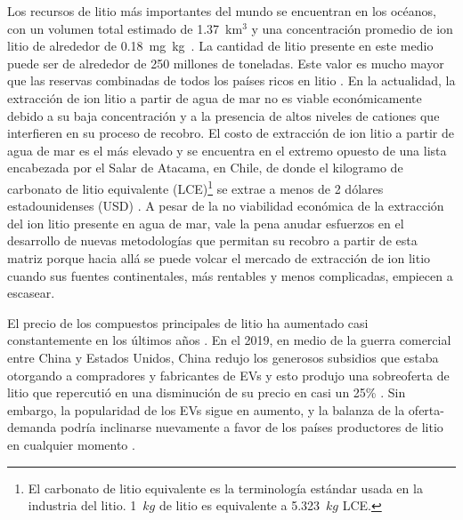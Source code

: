 Los recursos de litio más importantes del mundo se encuentran en los océanos, con un volumen total estimado de 1.37~km$^3$ y una concentración promedio de ion litio de alrededor de 0.18~mg~kg\mnn\ \citep{KRESS20191, Evans2013, HOSHINO201311}. La cantidad de litio presente en este medio puede ser de alrededor de 250 millones de toneladas. Este valor es mucho mayor que las reservas combinadas de todos los países ricos en litio \citep{Yang2018}. En la actualidad, la extracción de ion litio a partir de agua de mar no es viable económicamente debido a su baja concentración y a la presencia de altos niveles de cationes que interfieren en su proceso de recobro. El costo de extracción de ion litio a partir de agua de mar es el más elevado y se encuentra en el extremo opuesto de una lista encabezada por el Salar de Atacama, en Chile, de donde el kilogramo de carbonato de litio equivalente (LCE)\footnote{El carbonato de litio equivalente es la terminología estándar usada en la industria del litio. 1~$kg$ de litio es equivalente a 5.323~$kg$ LCE.} se extrae a menos de 2 dólares estadounidenses (USD) \citep{KUSHNIR2012}. A pesar de la no viabilidad económica de la extracción del ion litio presente en agua de mar, vale la pena anudar esfuerzos en el desarrollo de nuevas metodologías que permitan su recobro a partir de esta matriz porque hacia allá se puede volcar el mercado de extracción de ion litio cuando sus fuentes continentales, más rentables y menos complicadas, empiecen a escasear.

El precio de los compuestos principales de litio ha aumentado casi constantemente en los últimos años \citep{MARTIN2017}. En el 2019, en medio de la guerra comercial entre China y Estados Unidos, China redujo los generosos subsidios que estaba otorgando a compradores y fabricantes de \acp{EV} y esto produjo una sobreoferta de litio que repercutió en una disminución de su precio en casi un 25\% \citep{Kalantzakos2019}. Sin embargo, la popularidad de los \acp{EV} sigue en aumento, y la balanza de la oferta-demanda podría inclinarse nuevamente a favor de los países productores de litio en cualquier momento \citep{LIU2019}.



